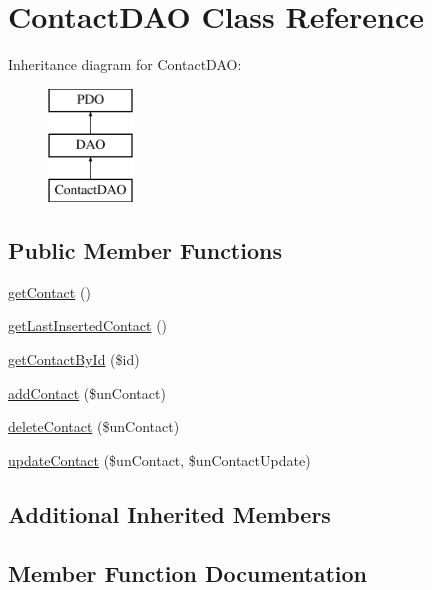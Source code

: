 \hypertarget{class_contact_d_a_o}{}\section{Contact\+D\+AO Class Reference}
\label{class_contact_d_a_o}
Inheritance diagram for Contact\+D\+AO\+:\begin{figure}[H]
\begin{center}
\leavevmode
\includegraphics[height=3.000000cm]{class_contact_d_a_o}
\end{center}
\end{figure}
\subsection*{Public Member Functions}
\begin{DoxyCompactItemize}
\item 
\hyperlink{class_contact_d_a_o_a349e30fba510419883ae407dce4775e1}{get\+Contact} ()
\item 
\hyperlink{class_contact_d_a_o_ab1ffa927e149ce08af2695923e0fb035}{get\+Last\+Inserted\+Contact} ()
\item 
\hyperlink{class_contact_d_a_o_a979717275ed9bc4280fd4c9a32c2e3a9}{get\+Contact\+By\+Id} (\$id)
\item 
\hyperlink{class_contact_d_a_o_aa85f1f7957eb273f0ab82d5f1f54c019}{add\+Contact} (\$un\+Contact)
\item 
\hyperlink{class_contact_d_a_o_ad1e4f25c7bfbdabca4cc023034ac7eb0}{delete\+Contact} (\$un\+Contact)
\item 
\hyperlink{class_contact_d_a_o_ac943e1247b998af68bd93265392a9e08}{update\+Contact} (\$un\+Contact, \$un\+Contact\+Update)
\end{DoxyCompactItemize}
\subsection*{Additional Inherited Members}


\subsection{Member Function Documentation}
\mbox{\label{class_contact_d_a_o_aa85f1f7957eb273f0ab82d5f1f54c019}} 
